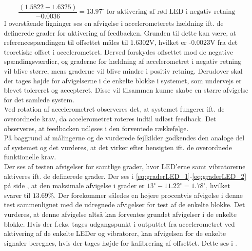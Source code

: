 \begin{equation}\label{eq:graderLED_1}
\dfrac{(1.5822 - 1.6325)}{-0.0036} = 13.97^{\circ}\text{ for aktivering af rød LED i negativ retning}
\end{equation}
\noindent I overstående ligninger ses en afvigelse i accelerometerets hældning ift. de definerede grader for aktivering af feedbacken. Grunden til dette kan være, at referencespændingen til offsettet måles til $1.6302$V, hvilket er -$0.0023$V fra det teoretiske offset i accelerometret. Derved forskydes offsettet mod de negative spændingsværdier, og graderne for hældning af accelerometret i negativ retning vil blive større, mens graderne vil blive mindre i positiv retning. Derudover skal der tages højde for afvigelserne i de enkelte blokke i systemet, som undervejs er blevet tolereret og accepteret. Disse vil tilsammen kunne skabe en større afvigelse for det samlede system. \\
Ved rotation af accelerometret observeres det, at systemet fungerer ift. de overordnede krav, da accelerometret roteres indtil udløst feedback. Det observeres, at feedbacken udløses i den forventede rækkefølge.\\
På baggrund af målingerne og de vurderede fejlkilder godkendes den analoge del af systemet og det vurderes, at det virker efter hensigten ift. de overordnede funktionelle krav.\\

Der ses af testen afvigelser for samtlige grader, hvor LED'erne samt vibratorerne aktiveres ift. de definerede grader. Der ses i \eqref{eq:graderLED_1}-\ref{eq:graderLED_2} på side \pageref{eq:graderLED_1}, at den maksimale afvigelse i grader er $13^{\circ} - 11.22^{\circ} = 1.78^{\circ}$, hvilket svarer til $13.69\%$. Der forekommer således en højere procentvis afvigelse i denne test sammenlignet med de udregnede afvigelser for test af de enkelte blokke. Det vurderes, at denne afvigelse altså kan forventes grundet afvigelser i de enkelte blokke. Hvis der f.eks. tages udgangspunkt i outputtet fra accelerometret ved aktivering af de enkelte LEDer og vibratorer, kan afvigelsen for de enkelte signaler beregnes, hvis der tages højde for kalibrering af offsettet. Dette ses i .

